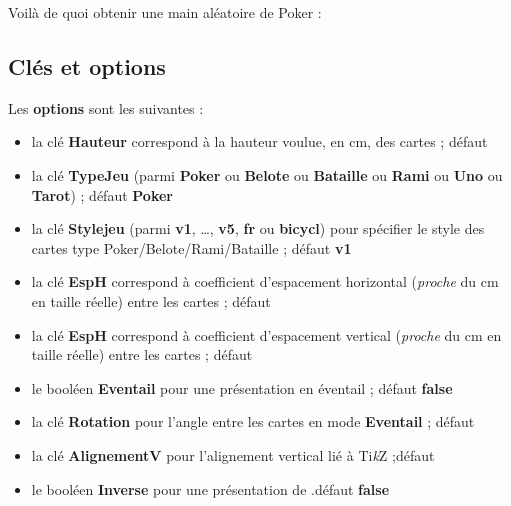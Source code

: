 \documentclass[a4paper]{article}
\providecommand\tikzlogo{Ti\textit{k}Z}
\let\TikZ\tikzlogo
\newcommand\cmaj[1]{\tcbox[vignetteMaJ]{#1}\xspace}
\newcommand\Cle[1]{{\bfseries\sffamily\textlangle #1\textrangle}}
\begin{document}
\begin{codetex}
\end{codetex}

\begin{codetex}[]
Voilà de quoi obtenir une main aléatoire de Poker :

\end{codetex}

\subsection{Clés et options}

\begin{codecles}
Les \Cle{options} sont les suivantes :

\begin{itemize}
	\item la clé \Cle{Hauteur} correspond à la hauteur voulue, en cm, des cartes ; \hfill{}défaut \Cle{4.25}
	\item la clé \Cle{TypeJeu} (parmi \Cle{Poker} ou \Cle{Belote} ou \Cle{Bataille} ou \Cle{Rami} ou \Cle{Uno} ou \Cle{Tarot}) ; \hfill{}défaut \Cle{Poker}
	\item \cmaj{0.2.4} la clé \Cle{Stylejeu} (parmi \Cle{v1}, \ldots, \Cle{v5}, \Cle{fr} ou \Cle{bicycl}) pour spécifier le style des cartes type \textsf{Poker/Belote/Rami/Bataille} ; \hfill{}défaut \Cle{v1}
	\item la clé \Cle{EspH} correspond à coefficient d'espacement horizontal (\textit{proche} du cm en taille réelle) entre les cartes ; \hfill{}défaut \Cle{1}
	\item la clé \Cle{EspH} correspond à coefficient d'espacement vertical (\textit{proche} du cm en taille réelle) entre les cartes ; \hfill{}défaut \Cle{0}
	\item le booléen \Cle{Eventail} pour une présentation en éventail ; \hfill{}défaut \Cle{false}
	\item la clé \Cle{Rotation} pour l'angle entre les cartes en mode \Cle{Eventail}  ; \hfill{}défaut \Cle{10}
	\item la clé \Cle{AlignementV} pour l'alignement vertical lié à \TikZ{} ;\hfill{}défaut \Cle{0.5}
	\item le booléen \Cle{Inverse} pour une présentation de .\hfill{}défaut \Cle{false}
\end{itemize}
\end{codecles}
\end{document}
